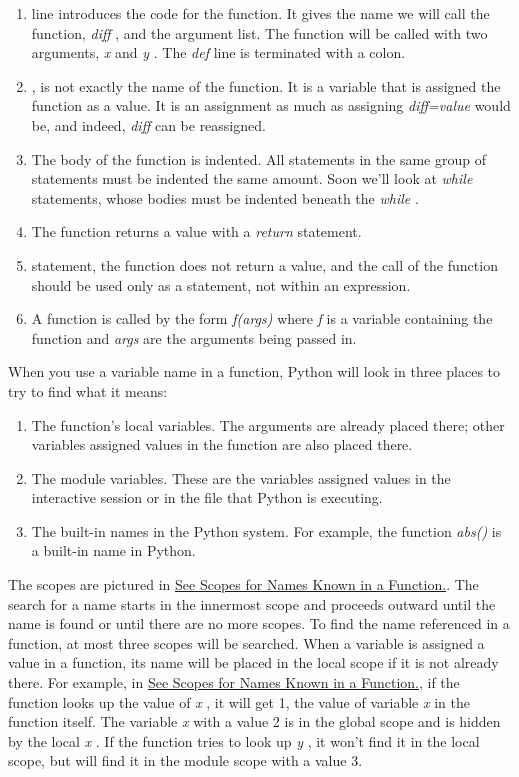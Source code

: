 \begin{enumerate}

\item
   line introduces
  the code for the function. It gives the name we will call the
  function, \emph{diff} , and the argument list. The function will be
  called with two arguments, \emph{x} and \emph{y} . The \emph{def} line
  is terminated with a colon.
\item
   , is not
  exactly the name of the function. It is a variable that is assigned
  the function as a value. It is an assignment as much as assigning
  \emph{diff=value} would be, and indeed, \emph{diff} can be reassigned.
\item
  The body of the function is
  indented. All statements in the same group of statements must be
  indented the same amount. Soon we'll look at \emph{while} statements,
  whose bodies must be indented beneath the \emph{while} .
\item
  The function returns a value with
  a \emph{return} statement.
\item
  
  statement, the function does not return a value, and the call of the
  function should be used only as a statement, not within an expression.
\item
  A function is called by the form
  \emph{f(args)} where \emph{f} is a variable containing the function
  and \emph{args} are the arguments being passed in.
\end{enumerate}

When you use a variable name in a
function, Python will look in three places to try to find what it means:

\begin{enumerate}

\item
  The function's local variables.
  The arguments are already placed there; other variables assigned
  values in the function are also placed there.
\item
  The module variables. These are
  the variables assigned values in the interactive session or in the
  file that Python is executing.
\item
  The built-in names in the Python
  system. For example, the function \emph{abs()} is a built-in name in
  Python.
\end{enumerate}

The scopes are pictured in
\href{chap2.html\#83458}{See Scopes for Names Known in a Function.}. The
search for a name starts in the innermost scope and proceeds outward
until the name is found or until there are no more scopes. To find the
name referenced in a function, at most three scopes will be searched.
When a variable is assigned a value in a function, its name will be
placed in the local scope if it is not already there. For example, in
\href{chap2.html\#83458}{See Scopes for Names Known in a Function.}, if
the function looks up the value of \emph{x} , it will get 1, the value
of variable \emph{x} in the function itself. The variable \emph{x} with
a value 2 is in the global scope and is hidden by the local \emph{x} .
If the function tries to look up \emph{y} , it won't find it in the
local scope, but will find it in the module scope with a value 3.

